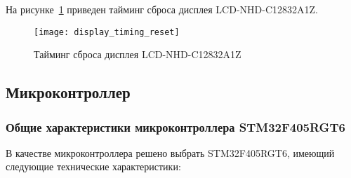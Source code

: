 \documentclass[document.tex]{subfiles}
\begin{document}
На рисунке~\ref{fig:display_timing_reset} приведен тайминг сброса дисплея LCD-NHD-C12832A1Z.
\begin{figure}[h]
\centering
\texttt{[image: display\_timing\_reset]}
\caption{Тайминг сброса дисплея LCD-NHD-C12832A1Z}
\label{fig:display_timing_reset}
\end{figure}

\clearpage
\subsection{Микроконтроллер}
\subsubsection{Общие характеристики микроконтроллера STM32F405RGT6}
В качестве микроконтроллера решено выбрать STM32F405RGT6, имеющий следующие технические характеристики:
\end{document}
